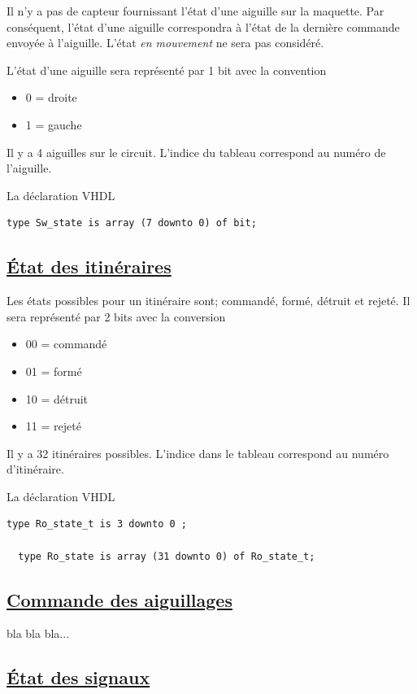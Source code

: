 Il n'y a pas de capteur fournissant l'état d'une aiguille sur la
maquette.  Par conséquent, l'état d'une aiguille correspondra à l'état
de la dernière commande envoyée à l'aiguille. L'état \emph{en
  mouvement} ne sera pas considéré.
 
L'état d'une aiguille sera représenté par 1 bit avec la convention
\begin{itemize}
\item 0 = droite
\item 1 = gauche
\end{itemize}
 
Il y a 4 aiguilles sur le circuit. L'indice du tableau correspond au
numéro de l'aiguille.

\medskip
La déclaration VHDL
\begin{lstlisting}[style=vhdl]
  type Sw_state is array (7 downto 0) of bit;
\end{lstlisting}


\subsection{\underline{\'Etat des itinéraires}}
\label{sec:st_iti}

Les états possibles pour un itinéraire sont; commandé, formé, détruit
et rejeté. Il sera représenté par 2 bits avec la conversion
\begin{itemize} 
\item 00 = commandé
\item 01 = formé
\item 10 = détruit
\item 11 = rejeté
\end{itemize}

Il y a 32 itinéraires possibles. L'indice dans le tableau correspond
au numéro d'itinéraire.

\medskip
La déclaration VHDL
\begin{lstlisting}[style=vhdl]
  type Ro_state_t is 3 downto 0 ;

  type Ro_state is array (31 downto 0) of Ro_state_t;
\end{lstlisting}


\subsection{\underline{Commande des aiguillages}}
\label{sec:cmd_aig}

bla bla bla...

\subsection{\underline{\'Etat des signaux}}
\label{sec:st_sig}

